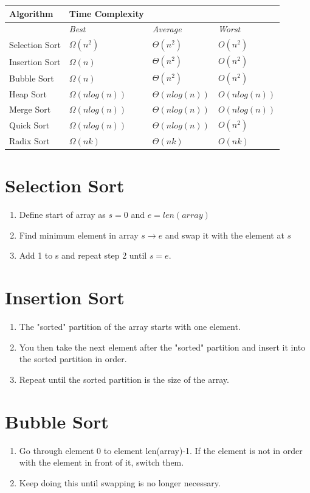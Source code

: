 \documentclass[a4paper,12pt]{report}
\begin{document}
\begin{tabular}{l|l|l|l}
\textbf{Algorithm} & \textbf{Time Complexity} \\
\hline
\textit{} & \textit{Best} & \textit{Average} & \textit{Worst} \\
\hline
Selection Sort & $\Omega(n^2)$ & $\Theta(n^2)$ & $O(n^2)$ \\
Insertion Sort & $\Omega(n)$ & $\Theta(n^2)$ & $O(n^2)$ \\
Bubble Sort & $\Omega(n)$ & $\Theta(n^2)$ & $O(n^2)$ \\
Heap Sort & $\Omega(nlog(n))$ & $\Theta(nlog(n))$ & $O(nlog(n))$ \\
Merge Sort & $\Omega(nlog(n))$ & $\Theta(nlog(n))$ & $O(nlog(n))$ \\
Quick Sort & $\Omega(nlog(n))$ & $\Theta(nlog(n))$ & $O(n^2)$ \\
Radix Sort & $\Omega(nk)$ & $\Theta(nk)$ & $O(nk)$ \\
\hline
\end{tabular}

\section{Selection Sort}
\begin{enumerate}
\item Define start of array as $s = 0$ and $e = len(array)$
\item Find minimum element in array $s \to e$ and swap it with the element at $s$
\item Add 1 to s and repeat step 2 until $s = e$.
\end{enumerate}
\section{Insertion Sort}
\begin{enumerate}
\item The "sorted" partition of the array starts with one element.
\item You then take the next element after the "sorted" partition and insert it into the sorted partition in order.
\item Repeat until the sorted partition is the size of the array.
\end{enumerate}

\section{Bubble Sort}
\begin{enumerate}
\item Go through element 0 to element len(array)-1. If the element is not in order with the element in front of it, switch them.
\item Keep doing this until swapping is no longer necessary.
\end{enumerate}
\end{document}
